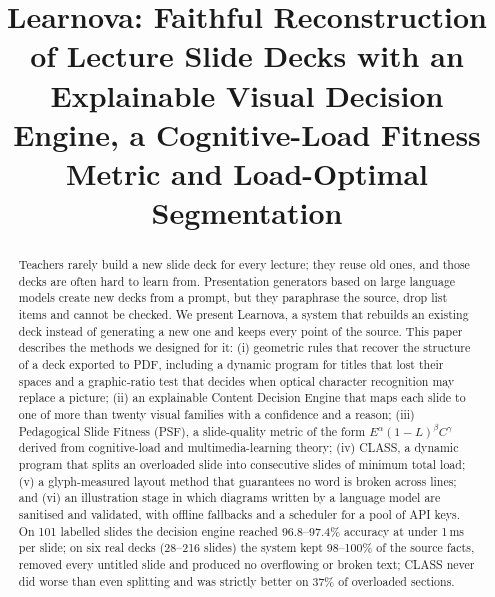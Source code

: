 \documentclass[conference]{IEEEtran}
\begin{document}
\title{Learnova: Faithful Reconstruction of Lecture Slide Decks with an Explainable Visual Decision Engine, a Cognitive-Load Fitness Metric and Load-Optimal Segmentation}

\author{
}

\maketitle

\begin{abstract}
Teachers rarely build a new slide deck for every lecture; they reuse old ones, and those decks are often hard to learn
from. Presentation generators based on large language models create new decks from a prompt, but they paraphrase the
source, drop list items and cannot be checked. We present Learnova, a system that rebuilds an existing deck instead of
generating a new one and keeps every point of the source. This paper describes the methods we designed for it:
(i) geometric rules that recover the structure of a deck exported to PDF, including a dynamic program for titles that lost
their spaces and a graphic-ratio test that decides when optical character recognition may replace a picture; (ii) an
explainable Content Decision Engine that maps each slide to one of more than twenty visual families with a confidence and
a reason; (iii) Pedagogical Slide Fitness (PSF), a slide-quality metric of the form $E^{\alpha}(1-L)^{\beta}C^{\gamma}$
derived from cognitive-load and multimedia-learning theory; (iv) CLASS, a dynamic program that splits an overloaded slide
into consecutive slides of minimum total load; (v) a glyph-measured layout method that guarantees no word is broken across
lines; and (vi) an illustration stage in which diagrams written by a language model are sanitised and validated, with
offline fallbacks and a scheduler for a pool of API keys. On 101 labelled slides the decision engine reached
96.8--97.4\% accuracy at under 1\,ms per slide; on six real decks (28--216 slides) the system kept 98--100\% of the source
facts, removed every untitled slide and produced no overflowing or broken text; CLASS never did worse than even splitting
and was strictly better on 37\% of overloaded sections.
\end{abstract}
\end{document}
